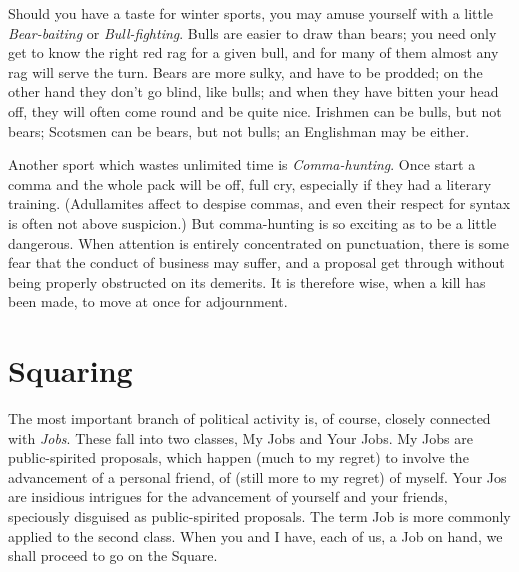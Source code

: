 \documentclass[12pt, oneside, b5paper]{memoir}
\begin{document}
Should you have a taste for winter sports, you may amuse yourself with a little \emph{Bear-baiting} or \emph{Bull-fighting}. Bulls are easier to draw than bears; you need only get to know the right red rag for a given bull, and for many of them almost any rag will serve the turn. Bears are more sulky, and have to be prodded; on the other hand they don't go blind, like bulls; and when they have bitten your head off, they will often come round and be quite nice. Irishmen can be bulls, but not bears; Scotsmen can be bears, but not bulls; an Englishman may be either.

Another sport which wastes unlimited time is \emph{Comma-hunting}. Once start a comma and the whole pack will be off, full cry, especially if they had a literary training. (Adullamites affect to despise commas, and even their respect for syntax is often not above suspicion.) But comma-hunting is so exciting as to be a little dangerous. When attention is entirely concentrated on punctuation, there is some fear that the conduct of business may suffer, and a proposal get through without being properly obstructed on its demerits. It is therefore wise, when a kill has been made, to move at once for adjournment. 

\chapter{Squaring}

The most important branch of political activity is, of course, closely connected with \emph{Jobs}. These fall into two classes, My Jobs and Your Jobs. My Jobs are public-spirited proposals, which happen (much to my regret) to involve the advancement of a personal friend, of (still more to my regret) of myself. Your Jos are insidious intrigues for the advancement of yourself and your friends, speciously disguised as public-spirited proposals. The term Job is more commonly applied to the second class. When you and I have, each of us, a Job on hand, we shall proceed to go on the Square.
\end{document}
